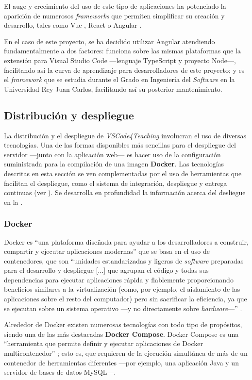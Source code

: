El auge y crecimiento del uso de este tipo de aplicaciones ha potenciado la aparición de numerosos \textit{frameworks} que permiten simplificar su creación y desarrollo, tales como Vue \cite{Tec_Vue}, React \cite{Tec_React} o Angular \cite{Tec_Angular}.

En el caso de este proyecto, se ha decidido utilizar Angular atendiendo fundamentalmente a dos factores: funciona sobre las mismas plataformas que la extensión para Visual Studio Code ---lenguaje TypeScript y proyecto Node---, facilitando así la curva de aprendizaje para desarrolladores de este proyecto; y es el \textit{framework} que se estudia durante el Grado en Ingeniería del \textit{Software} en la Universidad Rey Juan Carlos, facilitando así su posterior mantenimiento.

\subsection{Distribución y despliegue}
\label{subsec:tecDistribDespliegue}
La distribución y el despliegue de \textit{VSCode4Teaching} involucran el uso de diversas tecnologías. Una de las formas disponibles más sencillas para el despliegue del servidor ---junto con la aplicación web--- es hacer uso de la configuración suministrada para la compilación de una imagen \textbf{Docker}. Las tecnologías descritas en esta sección se ven complementadas por el uso de herramientas que facilitan el despliegue, como el sistema de integración, despliegue y entrega continuas (ver ). Se desarrolla en profundidad la información acerca del desliegue en la .

\subsubsection{Docker}
Docker es ``una plataforma diseñada para ayudar a los desarrolladores a construir, compartir y ejecutar aplicaciones modernas'' \cite{Tec_Docker} que se basa en el uso de contenedores, que son ``unidades estandarizadas y ligeras de \textit{software} preparadas para el desarrollo y despliegue [...] que agrupan el código y todas sus dependencias para ejecutar aplicaciones rápida y fiablemente proporcionando beneficios similares a la virtualización (como, por ejemplo, el aislamiento de las aplicaciones sobre el resto del computador) pero sin sacrificar la eficiencia, ya que se ejecutan sobre un sistema operativo ---y no directamente sobre \textit{hardware}---'' \cite{Tec_DockerContainers}.

Alrededor de Docker existen numerosas tecnologías con todo tipo de propósitos, siendo una de las más destacadas \textbf{Docker Compose}. Docker Compose es una ``herramienta que permite definir y ejecutar aplicaciones de Docker multicontenedor'' \cite{Tec_DockerCompose}; esto es, que requieren de la ejecución simultánea de más de un contenedor de herramientas diferentes ---por ejemplo, una aplicación Java y un servidor de bases de datos MySQL---.
